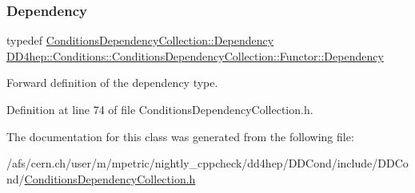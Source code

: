 \hypertarget{class_d_d4hep_1_1_conditions_1_1_conditions_dependency_collection_1_1_functor_af969f8adeb10039bf5d5d2b2751fc45b}{}\label{class_d_d4hep_1_1_conditions_1_1_conditions_dependency_collection_1_1_functor_af969f8adeb10039bf5d5d2b2751fc45b} 
\subsubsection{\texorpdfstring{Dependency}{Dependency}}
{\footnotesize\ttfamily typedef \hyperlink{class_d_d4hep_1_1_conditions_1_1_conditions_dependency_collection_a87252585d3e17ae82813c039b1b47e8a}{Conditions\+Dependency\+Collection\+::\+Dependency} \hyperlink{class_d_d4hep_1_1_conditions_1_1_conditions_dependency_collection_1_1_functor_af969f8adeb10039bf5d5d2b2751fc45b}{D\+D4hep\+::\+Conditions\+::\+Conditions\+Dependency\+Collection\+::\+Functor\+::\+Dependency}}



Forward definition of the dependency type. 



Definition at line 74 of file Conditions\+Dependency\+Collection.\+h.



The documentation for this class was generated from the following file\+:\begin{DoxyCompactItemize}
\item 
/afs/cern.\+ch/user/m/mpetric/nightly\+\_\+cppcheck/dd4hep/\+D\+D\+Cond/include/\+D\+D\+Cond/\hyperlink{_conditions_dependency_collection_8h}{Conditions\+Dependency\+Collection.\+h}\end{DoxyCompactItemize}

